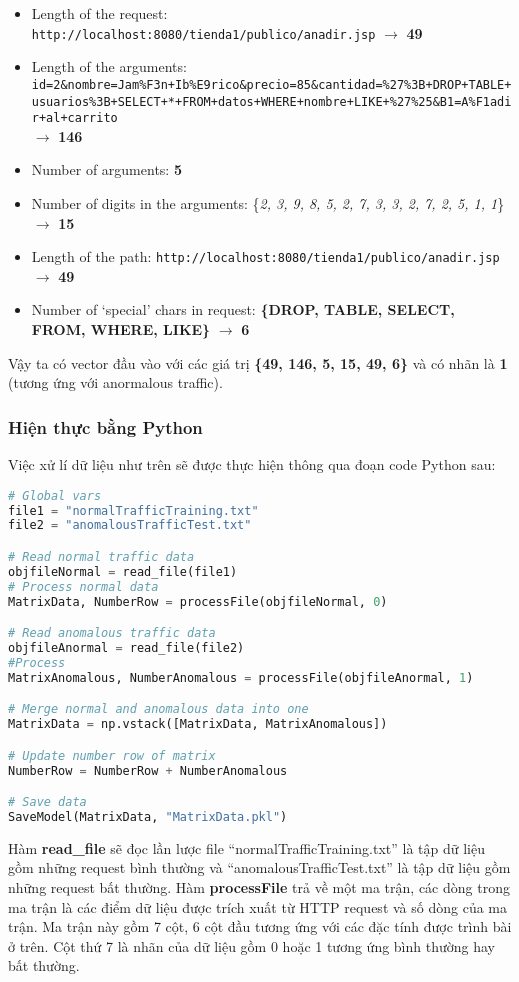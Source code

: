 \documentclass[../main-report.tex]{subfiles}
\begin{document}
\begin{itemize}
\item Length of the request: \lstinline{http://localhost:8080/tienda1/publico/anadir.jsp}{} $\to$ \textbf{49}
\item Length of the arguments: \lstinline{id=2&nombre=Jam%F3n+Ib%E9rico&precio=85&cantidad=%27%3B+DROP+TABLE+usuarios%3B+SELECT+*+FROM+datos+WHERE+nombre+LIKE+%27%25&B1=A%F1adir+al+carrito}{}\\ $\to$ \textbf{146}
\item Number of arguments: \textbf{5}
\item Number of digits in the arguments: \{\emph{2, 3, 9, 8, 5, 2, 7, 3, 3, 2, 7, 2, 5, 1, 1}\} $\to$ \textbf{15}
\item Length of the path: \lstinline{http://localhost:8080/tienda1/publico/anadir.jsp} $\to$ \textbf{49}
\item Number of `special' chars in request: \textbf{\{DROP, TABLE, SELECT, FROM, WHERE, LIKE\}} $\to$ \textbf{6}
\end{itemize}

Vậy ta có vector đầu vào với các giá trị \textbf{\{49, 146, 5, 15, 49, 6\}} và có nhãn là \textbf{1} (tương ứng với anormalous traffic).

\subsubsection*{Hiện thực bằng Python}
Việc xử lí dữ liệu như trên sẽ được thực hiện thông qua đoạn code Python sau:

\begin{lstlisting}[language=Python]
# Global vars
file1 = "normalTrafficTraining.txt"
file2 = "anomalousTrafficTest.txt"

# Read normal traffic data
objfileNormal = read_file(file1)
# Process normal data
MatrixData, NumberRow = processFile(objfileNormal, 0)

# Read anomalous traffic data
objfileAnormal = read_file(file2)
#Process
MatrixAnomalous, NumberAnomalous = processFile(objfileAnormal, 1)

# Merge normal and anomalous data into one
MatrixData = np.vstack([MatrixData, MatrixAnomalous])

# Update number row of matrix
NumberRow = NumberRow + NumberAnomalous

# Save data
SaveModel(MatrixData, "MatrixData.pkl")
\end{lstlisting}

Hàm \textbf{read\_file} sẽ đọc lần lược file ``normalTrafficTraining.txt''  là tập dữ liệu gồm những request bình thường và  ``anomalousTrafficTest.txt'' là tập dữ liệu gồm những request bất thường. Hàm \textbf{processFile} trả về một ma trận, các dòng trong ma trận là các điểm dữ liệu được trích xuất từ HTTP request và số dòng của ma trận. Ma trận này gồm 7 cột, 6 cột đầu tương ứng với các đặc tính được trình bài ở trên. Cột thứ 7 là nhãn của dữ liệu gồm 0 hoặc 1 tương ứng bình thường hay bất thường.
\end{document}
